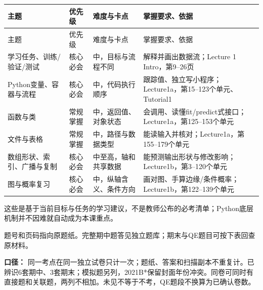
\begingroup
\small\setlength{\tabcolsep}{3pt}
\renewcommand{\arraystretch}{1.22}
\begin{longtable}{@{}>{\raggedright\arraybackslash}p{}>{\raggedright\arraybackslash}p{}>{\raggedright\arraybackslash}p{}>{\raggedright\arraybackslash}p{}@{}}
\toprule
主题 & 优先级 & 难度与卡点 & 掌握要求、依据 \\
\midrule\endfirsthead
主题 & 优先级 & 难度与卡点 & 掌握要求、依据 \\
\midrule\endhead
\bottomrule\endfoot
学习任务、训练/验证/测试 & 核心必会 & 中，目标与流程不同 & 解释并画出数据流；Lecture 1 Intro，第9–26页 \\
Python变量、容器与流程 & 核心必会 & 中，代码执行顺序 & 跟踪值、独立写小程序；Lecture1a，第15–123个单元、Tutorial1 \\
函数与类 & 常规掌握 & 中，返回值、对象状态 & 会调用、读懂fit/predict式接口；Lecture1a，第125–153个单元 \\
文件与表格 & 常规掌握 & 中，路径与数据类型 & 能读输入并核对；Lecture1a，第155–179个单元 \\
数组形状、索引、广播与复制 & 核心必会 & 中至高，轴和共享数据 & 能预测输出形状与修改影响；Lecture1b，第3–120个单元 \\
图与概率复习 & 核心必会 & 中，纵轴含义、条件方向 & 画对图、手算边缘/条件概率；Lecture1b，第122–139个单元 \\
\end{longtable}
\endgroup

这些是基于当前目标与任务的学习建议，不是教师公布的必考清单；Python底层机制并不因难就自动成为本课重点。



题号和页码指向原题纸。完整期中题答见独立题库；期末与QE题目可按下表回查原材料。




\textbf{口径：} 同一考点在同一独立试卷只计一次；题纸、答案和扫描副本不重复计。已辨识6套期中、3套期末；模拟题另列，2021B*保留封面年份冲突。同卷可同时有直接题和关联题，两列不相加。未见不等于不考，QE题段不换算为已确认卷数。


